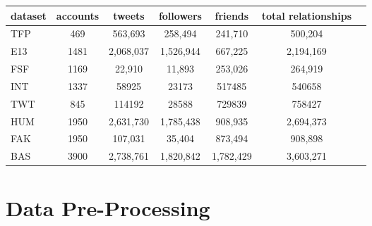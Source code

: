 \documentclass[a4paper,11pt]{article}
\begin{document}
\begin{tabular}{lcccccc}
dataset & accounts & tweets & followers & friends & total relationships \\
\hline
TFP & 469 & 563,693 & 258,494 & 241,710 & 500,204 \\
E13 & 1481 & 2,068,037 & 1,526,944 & 667,225 & 2,194,169 \\
FSF & 1169 & 22,910 & 11,893 & 253,026 & 264,919 \\
INT & 1337 & 58925 & 23173 & 517485 & 540658 \\
TWT & 845 & 114192 & 28588 & 729839 & 758427 \\
\hline
HUM & 1950 & 2,631,730 & 1,785,438 & 908,935 & 2,694,373 \\
FAK & 1950 & 107,031 & 35,404 & 873,494 & 908,898 \\
\hline
BAS & 3900 & 2,738,761 & 1,820,842 & 1,782,429 & 3,603,271 \\
\end{tabular}


\section{Data Pre-Processing}





\end{document}
